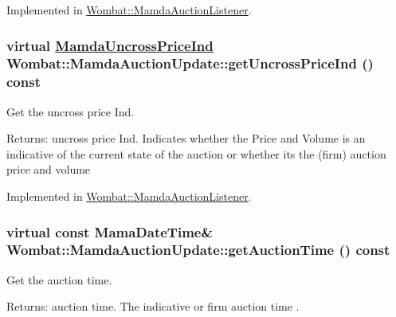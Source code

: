 Implemented in \hyperlink{classWombat_1_1MamdaAuctionListener_f6f979ad6d52cb722c975cbc0e5fd177}{Wombat::Mamda\-Auction\-Listener}.\hypertarget{classWombat_1_1MamdaAuctionUpdate_56cc041bff28b5acc670e9c163a9bd9c}{
\subsubsection[getUncrossPriceInd]{\setlength{\rightskip}{0pt plus 5cm}virtual \hyperlink{namespaceWombat_4f0ec767cbe150ee160f65e719e76226}{Mamda\-Uncross\-Price\-Ind} Wombat::Mamda\-Auction\-Update::get\-Uncross\-Price\-Ind () const}}
\label{classWombat_1_1MamdaAuctionUpdate_56cc041bff28b5acc670e9c163a9bd9c}


Get the uncross price Ind. 

\begin{Desc}
\item[Returns:]uncross price Ind. Indicates whether the Price and Volume is an indicative of the current state of the auction or whether its the (firm) auction price and volume \end{Desc}


Implemented in \hyperlink{classWombat_1_1MamdaAuctionListener_e42ba9609a3c40772a5cc3b89d5c5a93}{Wombat::Mamda\-Auction\-Listener}.\hypertarget{classWombat_1_1MamdaAuctionUpdate_2c9cf36bfb31b64dbea181acea7e34b7}{
\subsubsection[getAuctionTime]{\setlength{\rightskip}{0pt plus 5cm}virtual const Mama\-Date\-Time\& Wombat::Mamda\-Auction\-Update::get\-Auction\-Time () const}}
\label{classWombat_1_1MamdaAuctionUpdate_2c9cf36bfb31b64dbea181acea7e34b7}


Get the auction time. 

\begin{Desc}
\item[Returns:]auction time. The indicative or firm auction time . \end{Desc}


